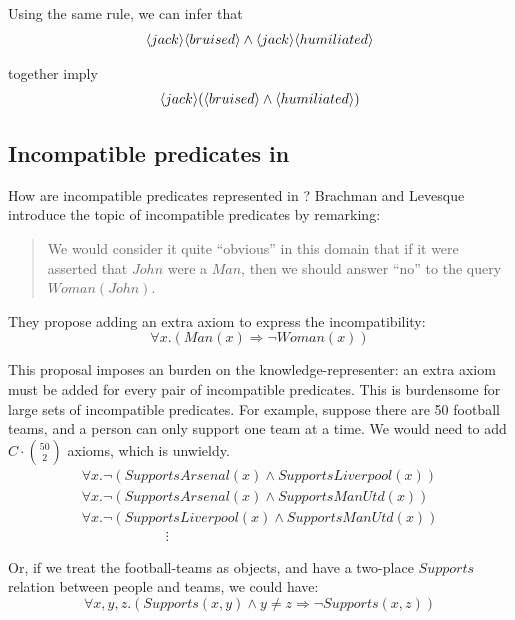 \NI Using the same rule, we can infer that
\begin{eqnarray*}
   \langle jack \rangle \langle bruised \rangle \land \langle jack \rangle \langle humiliated \rangle \end{eqnarray*}

\NI together imply
\begin{eqnarray*}
\langle jack \rangle (\langle bruised \rangle \land \langle humiliated \rangle )
\end{eqnarray*}
 
\subsection{Incompatible predicates in \fol}\label{incompatiblepredicatesinfol}

\NI How are incompatible predicates represented in 
\fol{}?  Brachman and Levesque \cite{brachman} introduce the
topic of incompatible predicates by remarking:
\begin{quote}
   We would consider it quite ``obvious'' in this domain that if it
   were asserted that $John$ were a $Man$, then we should answer
   ``no'' to the query $Woman(John)$.
\end{quote}

\NI They propose adding an extra axiom to express the incompatibility:
\[
   \forall x. ( Man(x) \Rightarrow \neg Woman(x) )
\]  
 
\NI This proposal imposes an burden on the knowledge-representer: an
extra axiom must be added for every pair of incompatible predicates.
This is burdensome for large sets of incompatible predicates.  For
example, suppose there are 50 football teams, and a person can only
support one team at a time.  We would need to add $C \cdot {50 \choose
  2}$ axioms, which is unwieldy.
\[
\begin{array}{l}
  \forall x.  \neg (SupportsArsenal(x) \land SupportsLiverpool(x))  \\
  \forall x.  \neg (SupportsArsenal(x) \land SupportsManUtd(x))  \\
  \forall x.  \neg (SupportsLiverpool(x) \land SupportsManUtd(x))  \\
  \qquad \qquad \qquad \vdots
\end{array}
\]

\NI Or, if we treat the football-teams as objects, and have a
two-place $Supports$ relation between people and teams, we could have:
\[
   \forall x, y, z. (Supports(x,y) \land y \neq z \Rightarrow \neg Supports(x,z))
\]   

